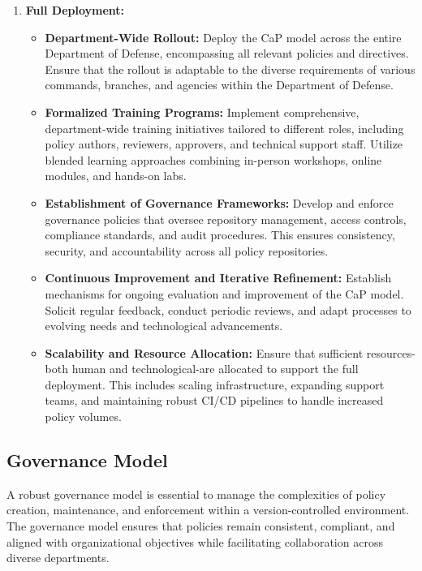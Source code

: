 \documentclass[11pt]{article}
\begin{document}
\begin{enumerate}
    \item \textbf{Full Deployment:}
    \begin{itemize}
        \item \textbf{Department-Wide Rollout:} Deploy the CaP model across the entire Department of Defense, encompassing all relevant policies and directives. Ensure that the rollout is adaptable to the diverse requirements of various commands, branches, and agencies within the Department of Defense.
        \item \textbf{Formalized Training Programs:} Implement comprehensive, department-wide training initiatives tailored to different roles, including policy authors, reviewers, approvers, and technical support staff. Utilize blended learning approaches combining in-person workshops, online modules, and hands-on labs.
        \item \textbf{Establishment of Governance Frameworks:} Develop and enforce governance policies that oversee repository management, access controls, compliance standards, and audit procedures. This ensures consistency, security, and accountability across all policy repositories.
        \item \textbf{Continuous Improvement and Iterative Refinement:} Establish mechanisms for ongoing evaluation and improvement of the CaP model. Solicit regular feedback, conduct periodic reviews, and adapt processes to evolving needs and technological advancements.
        \item \textbf{Scalability and Resource Allocation:} Ensure that sufficient resources-both human and technological-are allocated to support the full deployment. This includes scaling infrastructure, expanding support teams, and maintaining robust CI/CD pipelines to handle increased policy volumes.
    \end{itemize}
\end{enumerate}

\subsection{Governance Model}

A robust governance model is essential to manage the complexities of policy creation, maintenance, and enforcement within a version-controlled environment. The governance model ensures that policies remain consistent, compliant, and aligned with organizational objectives while facilitating collaboration across diverse departments.
\end{document}
